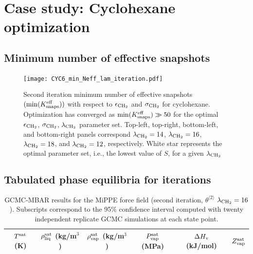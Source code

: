 \documentclass[journal=jctc,manuscript=article]{achemso}
\begin{document}
\newpage
\clearpage

\section{Case study: Cyclohexane optimization}

\subsection{Minimum number of effective snapshots} \label{SI sec: Min eff}

\begin{figure}[htb!]
	\centering
	\texttt{[image: CYC6\_min\_Neff\_lam\_iteration.pdf]}
	\caption{Second iteration minimum number of effective snapshots $(\min(K_{\rm snaps}^{\rm eff}))$ with respect to $\epsilon_{\rm CH_2}$ and $\sigma_{\rm CH_2}$ for cyclohexane. Optimization has converged as $\min(K_{\rm snaps}^{\rm eff}) \gg 50$ for the optimal $\epsilon_{\rm CH_2}$, $\sigma_{\rm CH_2}$, $\lambda_{\rm CH_2}$ parameter set. Top-left, top-right, bottom-left, and bottom-right panels correspond $\lambda_{\rm CH_2} = 14$, $\lambda_{\rm CH_2} = 16$, $\lambda_{\rm CH_2} = 18$, and $\lambda_{\rm CH_2} = 12$, respectively. White star represents the optimal parameter set, i.e., the lowest value of $S$, for a given $\lambda_{\rm CH_2}$}
	\label{SI fig:Iterate_Neff_CYC6}
\end{figure}

\newpage
\clearpage

\subsection{Tabulated phase equilibria for iterations}

	\begin{table}[htb!]
		\caption{GCMC-MBAR results for the MiPPE force field (second iteration, $\theta^{\langle2\rangle}$ $\lambda_{\rm CH_2} = 16$). Subscripts correspond to the 95\% confidence interval computed with twenty independent replicate GCMC simulations at each state point.}
		\begin{center}
			\begin{tabular}{|c|c|c|c|c|c|}
				\hline
				$T^{\rm sat}$ (K) & $\rho_{\rm liq}^{\rm sat}$ (kg/m$^3$) & $\rho_{\rm vap}^{\rm sat}$ (kg/m$^3$) & $P_{\rm vap}^{\rm sat}$ (MPa) & $\Delta H_{\rm v}$ (kJ/mol) & $Z_{\rm vap}^{\rm sat}$ \\ \hline
				
				\hline
			\end{tabular}
		\end{center}
	\end{table}
\end{document}

